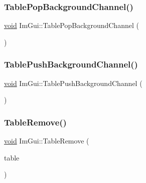 \subsubsection{\texorpdfstring{Table\+Pop\+Background\+Channel()}{TablePopBackgroundChannel()}}
{\footnotesize\ttfamily \hyperlink{imgui__impl__opengl3__loader_8h_ac668e7cffd9e2e9cfee428b9b2f34fa7}{void} Im\+Gui\+::\+Table\+Pop\+Background\+Channel (\begin{DoxyParamCaption}{ }\end{DoxyParamCaption})}

\mbox{\label{namespaceImGui_a6b6e0c511477248e9dd485c359f52eeb}} 
\subsubsection{\texorpdfstring{Table\+Push\+Background\+Channel()}{TablePushBackgroundChannel()}}
{\footnotesize\ttfamily \hyperlink{imgui__impl__opengl3__loader_8h_ac668e7cffd9e2e9cfee428b9b2f34fa7}{void} Im\+Gui\+::\+Table\+Push\+Background\+Channel (\begin{DoxyParamCaption}{ }\end{DoxyParamCaption})}

\mbox{\label{namespaceImGui_a3fa207dacfbee7ac3c7241dfea4fb638}} 
\subsubsection{\texorpdfstring{Table\+Remove()}{TableRemove()}}
{\footnotesize\ttfamily \hyperlink{imgui__impl__opengl3__loader_8h_ac668e7cffd9e2e9cfee428b9b2f34fa7}{void} Im\+Gui\+::\+Table\+Remove (\begin{DoxyParamCaption}\item[{\hyperlink{structImGuiTable}{Im\+Gui\+Table} $\ast$}]{table }\end{DoxyParamCaption})}

\mbox{\label{namespaceImGui_a068e3709ba63913c45a2c3177f511425}} 
